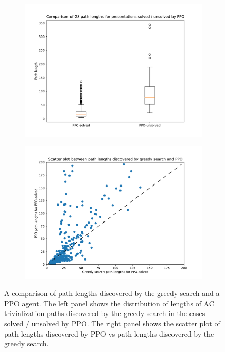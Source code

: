 \begin{figure}
	\centering
	\begin{subfigure}[b]{0.5\textwidth}
		\includegraphics[width=\textwidth]{fig/path_lengths_ppo_solved_vs_unsolved.pdf}
		\caption{}
	\label{fig:path_lengths_ppo_solved_vs_unsolved}
	\end{subfigure}%
	\begin{subfigure}[b]{0.5\textwidth}
		\centering
		\includegraphics[width=\textwidth]{fig/path_lengths_gs_vs_ppo.pdf}
		\caption{}
		\label{fig:path_lengths_gs_vs_ppo}
	\end{subfigure}
	\caption{A comparison of path lengths discovered by the greedy search and a PPO agent. The left panel shows the distribution of lengths of AC trivialization paths discovered by the greedy search in the cases solved / unsolved by PPO. The right panel shows the scatter plot of path lengths discovered by PPO vs path lengths discovered by the greedy search.}
	\label{fig:path_lengths_gs_vs_ppo_full}
\end{figure}